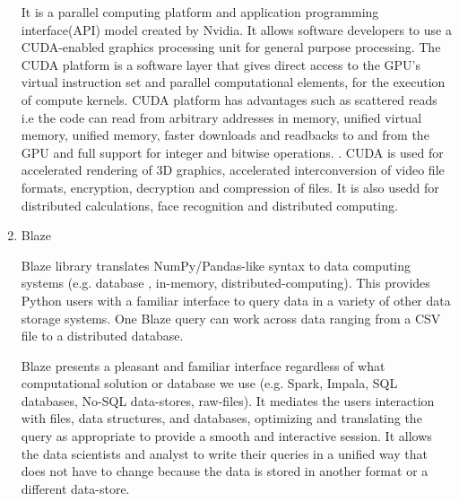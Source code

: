 \begin{enumerate}
It is a parallel computing platform and application programming
interface(API) model created by Nvidia. It allows software developers
to use a CUDA-enabled graphics processing unit for general purpose
processing. The CUDA platform is a software layer that gives direct
access to the GPU's virtual instruction set and parallel computational
elements, for the execution of compute kernels.  CUDA platform has
advantages such as scattered reads i.e the code can read from
arbitrary addresses in memory, unified virtual memory, unified memory,
faster downloads and readbacks to and from the GPU and full support
for integer and bitwise operations. \label{\detokenize{i524/technologies:id703}}{\hyperref[\detokenize{i524/technologies:www-cuda-wikipedia}]{\sphinxcrossref{{[}614{]}}}}.  CUDA
is used for accelerated rendering of 3D graphics, accelerated
interconversion of video file formats, encryption, decryption and
compression of files.  It is also usedd for distributed calculations,
face recognition and distributed computing. \label{\detokenize{i524/technologies:id704}}{\hyperref[\detokenize{i524/technologies:www-cuda-wikipedia}]{\sphinxcrossref{{[}614{]}}}}

\item {} 
Blaze

Blaze library translates NumPy/Pandas-like syntax to data
computing systems (e.g. database , in-memory,
distributed-computing). This provides Python users with a
familiar interface to query data in a variety of other data
storage systems.  One Blaze query can work across data ranging
from a CSV file to a distributed database.

Blaze presents a pleasant and familiar interface regardless of
what computational solution or database we use (e.g. Spark,
Impala, SQL databases, No-SQL data-stores, raw-files). It
mediates the users interaction with files, data structures, and
databases, optimizing and translating the query as appropriate to
provide a smooth and interactive session. It allows the data
scientists and analyst to write their queries in a unified way
that does not have to change because the data is stored in
another format or a different data-store. \label{\detokenize{i524/technologies:id705}}{\hyperref[\detokenize{i524/technologies:www-blaze}]{\sphinxcrossref{{[}615{]}}}}

\end{enumerate}
